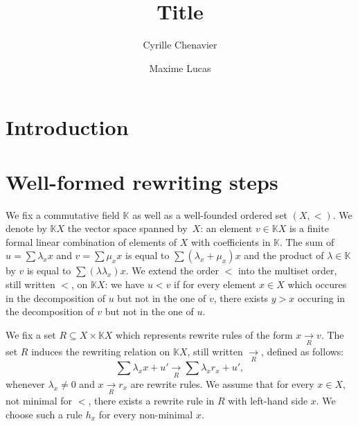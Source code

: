 \documentclass[10pt]{easychair}
\theoremstyle{definition}
\newcommand\K{\mathbb{K}}
\newcommand\KX{\K X}
\newcommand\rewR{\underset{R}{\longrightarrow}}
\begin{document}
\title{Title}

\author{
Cyrille Chenavier
\and
Maxime Lucas
}



\maketitle

\begin{abstract}

  
\end{abstract}
 
\section{Introduction}

\section{Well-formed rewriting steps}

We fix a commutative field $\K$ as well as a well-founded ordered set
$(X,<)$. We denote by $\KX$ the vector space spanned by~$X$: an element
$v\in\KX$ is a finite formal linear combination of elements of $X$ with
coefficients in $\K$. The sum of $u=\sum\lambda_xx$ and $v=\sum\mu_xx$ is
equal to $\sum(\lambda_x+\mu_x)x$ and the product of $\lambda\in\K$ by
$v$ is equal to $\sum(\lambda\lambda_x)x$. We extend the order $<$ into
the multiset order, still written $<$, on $\KX$: we have $u<v$ if for
every element $x\in X$ which occures in the decomposition of $u$ but not
in the one of $v$, there exists $y>x$ occuring in the decomposition of
$v$ but not in the one of $u$.

\medskip

We fix a set $R\subseteq X\times\KX$ which represents rewrite rules of
the form $x\rewR v$. The set $R$ induces the rewriting relation on $\KX$,
still written $\rewR$, defined as follows:
\begin{equation}\label{equ:rewrite_step}
  \sum\lambda_xx+u'\rewR\sum\lambda_xr_x+u',
\end{equation}
whenever $\lambda_x\neq 0$ and $x\rewR r_x$ are rewrite rules. We assume
that for every $x\in X$, not minimal for $<$, there exists a rewrite rule
in $R$ with left-hand side $x$. We choose such a rule $h_x$ for every
non-minimal $x$.
\end{document}
